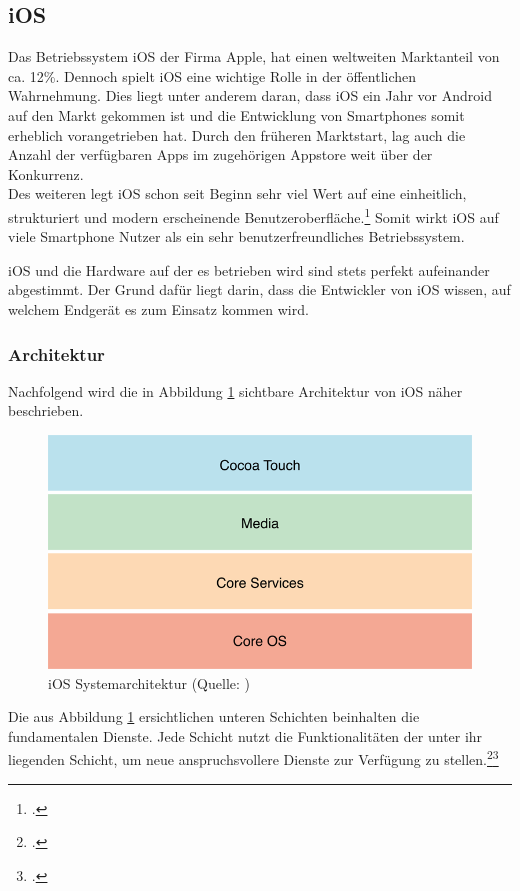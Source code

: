 \subsection{iOS}
Das Betriebssystem iOS der Firma Apple, hat einen weltweiten Marktanteil von ca. 12\%. Dennoch spielt iOS eine wichtige Rolle in der öffentlichen Wahrnehmung. Dies liegt unter anderem daran, dass iOS ein Jahr vor Android auf den Markt gekommen ist und die Entwicklung von Smartphones somit erheblich vorangetrieben hat. Durch den früheren Marktstart, lag auch die Anzahl der verfügbaren Apps im zugehörigen Appstore weit über der Konkurrenz.\\
Des weiteren legt iOS schon seit Beginn sehr viel Wert auf eine einheitlich, strukturiert und modern erscheinende Benutzeroberfläche.\footcite[vgl.:][]{androidVSios}
Somit wirkt iOS auf viele Smartphone Nutzer als ein sehr benutzerfreundliches Betriebssystem.

iOS und die Hardware auf der es betrieben wird sind stets perfekt aufeinander abgestimmt. Der Grund dafür liegt darin, dass die Entwickler von iOS wissen, auf welchem Endgerät es zum Einsatz kommen wird.

\subsubsection{Architektur}
Nachfolgend wird die in Abbildung \ref{figIOSSystem} sichtbare Architektur von iOS näher beschrieben.

\begin{figure}[h]
	\centering
  \includegraphics[scale=0.6]{images/iOS_Layers.png}
	\caption{iOS Systemarchitektur (Quelle: \cite[][]{layersOfIos})}
	\label{figIOSSystem}
\end{figure}

Die aus Abbildung \ref{figIOSSystem} ersichtlichen unteren Schichten beinhalten die fundamentalen Dienste. Jede Schicht nutzt die Funktionalitäten der unter ihr liegenden Schicht, um neue anspruchsvollere Dienste zur Verfügung zu stellen.\footcite[vgl.:][]{iOS}\footcite[vlg.:][S. 55 f.]{practicalswift:iosArchitecutre}

